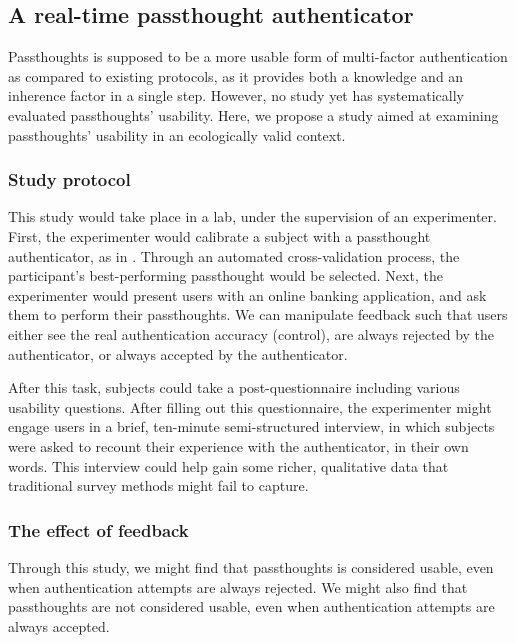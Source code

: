 \documentclass[sigconf]{acmart}
\begin{document}
\subsection{A real-time passthought authenticator}
\label{sec:orgee7565e}

Passthoughts is supposed to be a more usable form of multi-factor authentication
as compared to existing protocols,
as it provides both a knowledge and an inherence factor in a single step.
However, no study yet has systematically evaluated passthoughts' usability.
Here, we propose a study aimed at examining passthoughts' usability in an ecologically valid context.

\subsubsection{Study protocol}
\label{sec:orgdd8e5d6}

This study would take place in a lab, under the supervision of an experimenter.
First, the experimenter would calibrate a subject with a passthought authenticator, as in \cite{Chuang2013b}.
Through an automated cross-validation process, the participant's best-performing passthought would be selected.
Next, the experimenter would present users with an online banking application, and ask them to perform their passthoughts.
We can manipulate feedback such that users either see the real authentication accuracy (control), 
are always rejected by the authenticator, 
or always accepted by the authenticator.

After this task, subjects could take a post-questionnaire including various usability questions.
After filling out this questionnaire, the experimenter might engage users in a brief, ten-minute semi-structured interview,
in which subjects were asked to recount their experience with the authenticator, in their own words.
This interview could help gain some richer, qualitative data that traditional survey methods might fail to capture.

\subsubsection{The effect of feedback}
\label{sec:org7f32cae}

Through this study, we might find 
that passthoughts is considered usable, even when authentication attempts are always rejected.
We might also find that passthoughts are not considered usable, 
even when authentication attempts are always accepted.
\end{document}
